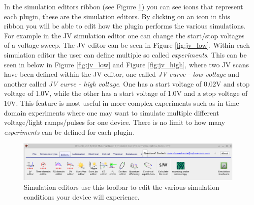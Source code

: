 In the simulation editors ribbon (see Figure \ref{fig:simeditors}) you can see icons that represent each plugin, these are the simulation editors. By clicking on an icon in this ribbon you will be able to edit how the plugin performs the various simulations.  For example in the JV simulation editor one can change the start/stop voltages of a voltage sweep.  The JV editor can be seen in Figure \ref{fig:jv_low}. Within each simulation editor the user can define multiple so called \emph{experiments}. This can be seen in below in Figure \ref{fig:jv_low} and Figure \ref{fig:jv_high}, where two JV scans have been defined within the JV editor, one called \emph{JV curve - low voltage} and another called \emph{JV curve - high voltage}. One has a start voltage of 0.02V and stop voltage of 1.0V, while the other has a start voltage of 1.0V and a stop voltage of 10V.  This feature is most useful in more complex experiments such as in time domain experiments where one may want to simulate multiple different voltage/light ramps/pulses for one device. There is no limit to how many \emph{experiments} can be defined for each plugin.
\\
\begin{figure}
\centering
\includegraphics[width=\linewidth,height=0.2\linewidth]{./images/sim_editors/ribbon_sim_editors.png}
\caption{Simulation editors use this toolbar to edit the various simulation conditions your device will experience.}
\label{fig:simeditors}
\end{figure}

